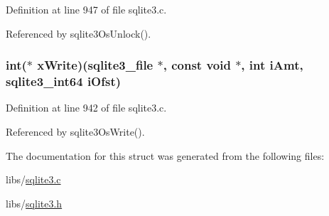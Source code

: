 Definition at line 947 of file sqlite3.\+c.



Referenced by sqlite3\+Os\+Unlock().

\hypertarget{structsqlite3__io__methods_ada19091e7f4ffc5accb40e38d001a801}{}
\subsubsection[{x\+Write}]{\setlength{\rightskip}{0pt plus 5cm}int($\ast$ x\+Write)({\bf sqlite3\+\_\+file} $\ast$, const void $\ast$, int i\+Amt, {\bf sqlite3\+\_\+int64} i\+Ofst)}\label{structsqlite3__io__methods_ada19091e7f4ffc5accb40e38d001a801}


Definition at line 942 of file sqlite3.\+c.



Referenced by sqlite3\+Os\+Write().



The documentation for this struct was generated from the following files\+:\begin{DoxyCompactItemize}
\item 
libs/\hyperlink{sqlite3_8c}{sqlite3.\+c}\item 
libs/\hyperlink{sqlite3_8h}{sqlite3.\+h}\end{DoxyCompactItemize}
